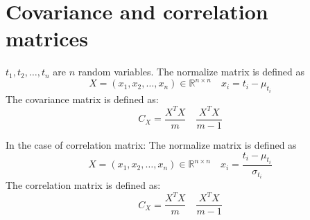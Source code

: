 \chapter{Covariance and correlation matrices}

$t_1, t_2, \ldots, t_n$ are $n$ random variables.
The normalize matrix is defined as
$$
X = (x_1, x_2, \ldots, x_n) \in \mathbb{R}^{n \times n}
\quad x_i = t_i - \mu_{t_i}
$$
The covariance matrix is defined as:
$$
C_X =  \frac{X^TX}{m} \quad \frac{X^TX}{m - 1}
$$

In the case of correlation matrix:
The normalize matrix is defined as
$$
X = (x_1, x_2, \ldots, x_n) \in \mathbb{R}^{n \times n}
\quad x_i = \frac{t_i - \mu_{t_i}}{\sigma_{t_i}}
$$
The correlation matrix is defined as:
$$
C_X =  \frac{X^TX}{m} \quad \frac{X^TX}{m - 1}
$$

